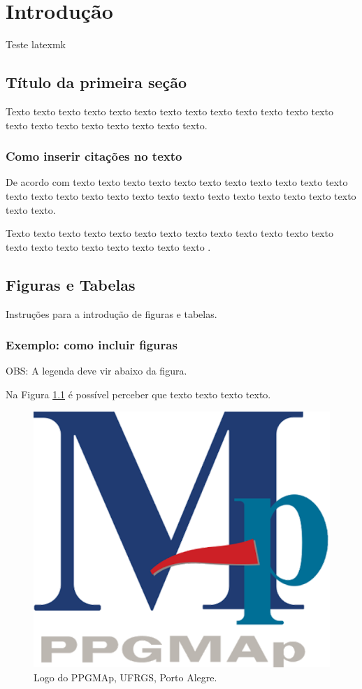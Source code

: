 \chapter{Introdução}
Teste latexmk
\section{Título da primeira seção}
Texto texto texto texto texto texto texto texto texto texto texto texto texto texto texto texto texto texto texto texto texto.

\subsection{Como inserir citações no texto}

De acordo com \cite{bucur2016nonlocal} texto texto texto texto texto texto texto texto texto texto texto texto texto texto texto texto texto texto texto texto texto texto texto texto texto texto texto.

Texto texto texto  texto texto texto texto texto texto texto texto texto texto texto texto texto texto texto texto texto texto \cite{huang2014numerical,warnatz06}.

\section{Figuras e Tabelas}\label{sec3}

Instruções para a introdução de figuras e tabelas.


\subsection{Exemplo: como incluir figuras}
OBS: A legenda deve vir abaixo da figura.

Na Figura \ref{figura01} é possível perceber que texto texto texto texto.
\begin{figure}
\centering
\includegraphics[width=.3\textwidth]{chap/logoppgmap.png}
\caption{ {\small Logo do PPGMAp, UFRGS, Porto Alegre.}}
\label{figura01}
\end{figure}

